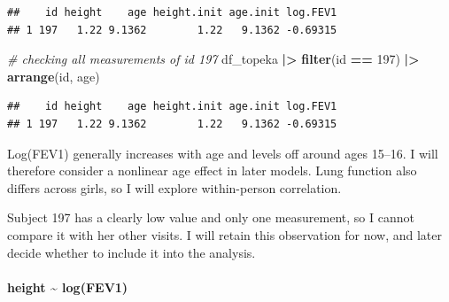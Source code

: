 \documentclass[
]{article}
\newenvironment{Shaded}{\begin{snugshade}}{\end{snugshade}}
\newcommand{\CommentTok}[1]{\textcolor[rgb]{0.56,0.35,0.01}{\textit{#1}}}
\newcommand{\DecValTok}[1]{\textcolor[rgb]{0.00,0.00,0.81}{#1}}
\newcommand{\FunctionTok}[1]{\textcolor[rgb]{0.13,0.29,0.53}{\textbf{#1}}}
\newcommand{\NormalTok}[1]{#1}
\newcommand{\SpecialCharTok}[1]{\textcolor[rgb]{0.81,0.36,0.00}{\textbf{#1}}}
\begin{document}
\begin{verbatim}
##    id height    age height.init age.init log.FEV1
## 1 197   1.22 9.1362        1.22   9.1362 -0.69315
\end{verbatim}

\begin{Shaded}
\begin{Highlighting}[]
\CommentTok{\# checking all measurements of id 197}
\NormalTok{df\_topeka }\SpecialCharTok{|\textgreater{}}
  \FunctionTok{filter}\NormalTok{(id }\SpecialCharTok{==} \DecValTok{197}\NormalTok{) }\SpecialCharTok{|\textgreater{}}
  \FunctionTok{arrange}\NormalTok{(id, age)}
\end{Highlighting}
\end{Shaded}

\begin{verbatim}
##    id height    age height.init age.init log.FEV1
## 1 197   1.22 9.1362        1.22   9.1362 -0.69315
\end{verbatim}

Log(FEV1) generally increases with age and levels off around ages
15--16. I will therefore consider a nonlinear age effect in later
models. Lung function also differs across girls, so I will explore
within-person correlation.

Subject 197 has a clearly low value and only one measurement, so I
cannot compare it with her other visits. I will retain this observation
for now, and later decide whether to include it into the analysis.

\paragraph{height \textasciitilde{} log(FEV1)}\label{height-logfev1}
\end{document}
